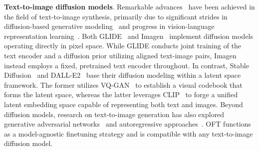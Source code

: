 \textbf{Text-to-image diffusion models}. Remarkable advances~\cite{saharia2022photorealistic,ramesh2022hierarchical,rombach2022high,gu2022vector,nichol2022glide} have been achieved in the field of text-to-image synthesis, primarily due to significant strides in diffusion-based generative modeling~\cite{ho2020denoising,song2021score,song2021denoising,dhariwal2021diffusion} and progress in vision-language representation learning~\cite{su2020vlbert,lu2019vilbert,radford2021learning,wang2021simvlm,li2022blip,li2023blip,alayrac2022flamingo,schuhmann2022laion}. Both GLIDE~\cite{nichol2022glide} and Imagen~\cite{saharia2022photorealistic} implement diffusion models operating directly in pixel space. While GLIDE conducts joint training of the text encoder and a diffusion prior utilizing aligned text-image pairs, Imagen instead employs a fixed, pretrained text encoder throughout. In contrast, Stable Diffusion~\cite{rombach2022high} and DALL-E2~\cite{ramesh2022hierarchical} base their diffusion modeling within a latent space framework. The former utilizes VQ-GAN~\cite{esser2021taming} to establish a visual codebook that forms the latent space, whereas the latter leverages CLIP~\cite{radford2021learning} to forge a unified latent embedding space capable of representing both text and images. Beyond diffusion models, research on text-to-image generation has also explored generative adversarial networks~\cite{reed2016generative,zhang2017stackgan,xu2018attngan,li2019controllable} and autoregressive approaches~\cite{ramesh2021zero,ding2021cogview,wu2022nuwa,yuscaling}. OFT functions as a model-agnostic finetuning strategy and is compatible with any text-to-image diffusion model.

